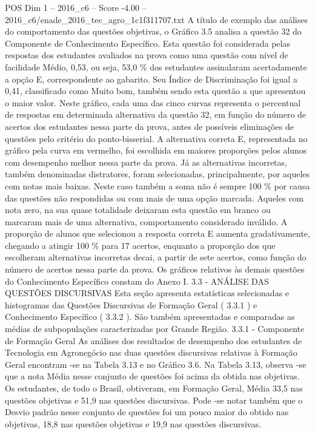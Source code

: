 \begin{textsample}{POS Dim 1 – 2016\_c6 – Score -4.00 – 2016\_c6/enade\_2016\_tec\_agro\_1c1f311707.txt}
A título de exemplo das análises do comportamento das questões objetivas, o Gráfico 3.5 analisa a questão 32 do Componente de Conhecimento Específico.
Esta questão foi considerada pelas respostas dos estudantes avaliados na prova como uma questão com nível de facilidade Médio, 0,53, ou seja, 53,0 \% dos estudantes assinalaram acertadamente a opção E, correspondente ao gabarito.
Seu Índice de Discriminação foi igual a 0,41, classificado como Muito bom, também sendo esta questão a que apresentou o maior valor.
Neste gráfico, cada uma das cinco curvas representa o percentual de respostas em determinada alternativa da questão 32, em função do número de acertos dos estudantes nessa parte da prova, antes de possíveis eliminações de questões pelo critério do ponto-bisserial.
A alternativa correta E, representada no gráfico pela curva em vermelho, foi escolhida em maiores proporções pelos alunos com desempenho melhor nessa parte da prova.
Já as alternativas incorretas, também denominadas distratores, foram selecionadas, principalmente, por aqueles com notas mais baixas.
Neste caso também a soma não é sempre 100 \% por causa das questões não respondidas ou com mais de uma opção marcada.
Aqueles com nota zero, na sua quase totalidade deixaram esta questão em branco ou marcaram mais de uma alternativa, comportamento considerado inválido.
A proporção de alunos que selecionou a resposta correta E aumenta gradativamente, chegando a atingir 100 \% para 17 acertos, enquanto a proporção dos que escolheram alternativas incorretas decai, a partir de sete acertos, como função do número de acertos nessa parte da prova.
Os gráficos relativos às demais questões do Conhecimento Específico constam do Anexo I. 3.3 - ANÁLISE DAS QUESTÕES DISCURSIVAS Esta seção apresenta estatísticas selecionadas e histogramas das Questões Discursivas de Formação Geral ( 3.3.1 ) e Conhecimento Específico ( 3.3.2 ).
São também apresentadas e comparadas as médias de subpopulações caracterizadas por Grande Região. 3.3.1 - Componente de Formação Geral As análises dos resultados de desempenho dos estudantes de Tecnologia em Agronegócio nas duas questões discursivas relativas à Formação Geral encontram -se na Tabela 3.13 e no Gráfico 3.6.
Na Tabela 3.13, observa -se que a nota Média nesse conjunto de questões foi acima da obtida nas objetivas.
Os estudantes, de todo o Brasil, obtiveram, em Formação Geral, Média 33,5 nas questões objetivas e 51,9 nas questões discursivas.
Pode -se notar também que o Desvio padrão nesse conjunto de questões foi um pouco maior do obtido nas objetivas, 18,8 nas questões objetivas e 19,9 nas questões discursivas.

\end{textsample}
